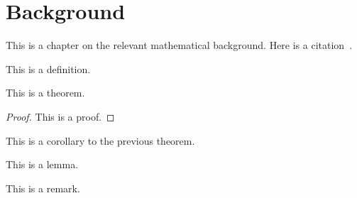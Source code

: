
\chapter{Background}%
\label{chap:background}

This is a chapter on the relevant mathematical background. Here is a citation~\cite{mason-1984-diophantine-equations-over}.

\begin{definition}
  This is a definition.
\end{definition}

\begin{theorem}
  This is a theorem.
\end{theorem}

\begin{proof}
  This is a proof.
\end{proof}

\begin{corollary}
  This is a corollary to the previous theorem.
\end{corollary}

\begin{lemma}
  This is a lemma.
\end{lemma}

\begin{remark}
  This is a remark.
\end{remark}
